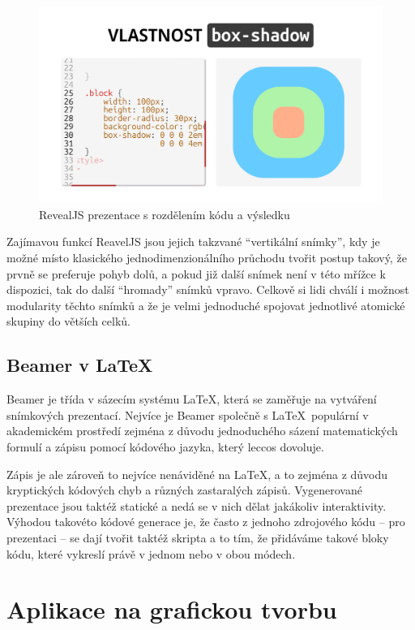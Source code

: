 \begin{figure}[h!]
    \centering
    \includegraphics[width=0.9\linewidth]{media/03_analyza/revealjs.png}
    \caption{RevealJS prezentace s rozdělením kódu a výsledku}
    \label{fig:anaylza:revealjs-ukazka}
\end{figure}

Zajímavou funkcí ReavelJS jsou jejich takzvané \enquote{vertikální snímky}, kdy je možné místo klasického jednodimenzionálního průchodu tvořit postup takový, že prvně se preferuje pohyb dolů, a pokud již další snímek není v této mřížce k dispozici, tak do další \enquote{hromady} snímků vpravo. 
Celkově si lidi chválí i možnost modularity těchto snímků a že je velmi jednoduché spojovat jednotlivé atomické skupiny do větších celků.

\subsection{Beamer v \LaTeX}

Beamer je třída v sázecím systému \LaTeX, která se zaměřuje na vytváření snímkových prezentací.
Nejvíce je Beamer společně s \LaTeX~populární v akademickém prostředí zejména z důvodu jednoduchého sázení matematických formulí a zápisu pomocí kódového jazyka, který leccos dovoluje. 

Zápis je ale zároveň to nejvíce nenáviděné na \LaTeX, a to zejména z důvodu kryptických kódových chyb a různých zastaralých zápisů.
Vygenerované prezentace jsou taktéž statické a nedá se v nich dělat jakákoliv interaktivity. 
Výhodou takovéto kódové generace je, že často z jednoho zdrojového kódu -- pro prezentaci -- se dají tvořit taktéž skripta a to tím, že přidáváme takové bloky kódu, které vykreslí právě v jednom nebo v obou módech.

\section{Aplikace na grafickou tvorbu}


